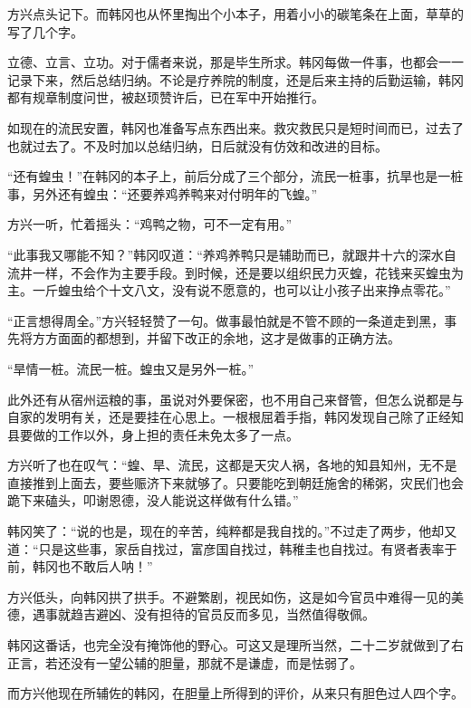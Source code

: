 方兴点头记下。而韩冈也从怀里掏出个小本子，用着小小的碳笔条在上面，草草的写了几个字。

立德、立言、立功。对于儒者来说，那是毕生所求。韩冈每做一件事，也都会一一记录下来，然后总结归纳。不论是疗养院的制度，还是后来主持的后勤运输，韩冈都有规章制度问世，被赵顼赞许后，已在军中开始推行。

如现在的流民安置，韩冈也准备写点东西出来。救灾救民只是短时间而已，过去了也就过去了。不及时加以总结归纳，日后就没有仿效和改进的目标。

“还有蝗虫！”在韩冈的本子上，前后分成了三个部分，流民一桩事，抗旱也是一桩事，另外还有蝗虫：“还要养鸡养鸭来对付明年的飞蝗。”

方兴一听，忙着摇头：“鸡鸭之物，可不一定有用。”

“此事我又哪能不知？”韩冈叹道：“养鸡养鸭只是辅助而已，就跟井十六的深水自流井一样，不会作为主要手段。到时候，还是要以组织民力灭蝗，花钱来买蝗虫为主。一斤蝗虫给个十文八文，没有说不愿意的，也可以让小孩子出来挣点零花。”

“正言想得周全。”方兴轻轻赞了一句。做事最怕就是不管不顾的一条道走到黑，事先将方方面面的都想到，并留下改正的余地，这才是做事的正确方法。

“旱情一桩。流民一桩。蝗虫又是另外一桩。”

此外还有从宿州运粮的事，虽说对外要保密，也不用自己来督管，但怎么说都是与自家的发明有关，还是要挂在心思上。一根根屈着手指，韩冈发现自己除了正经知县要做的工作以外，身上担的责任未免太多了一点。

方兴听了也在叹气：“蝗、旱、流民，这都是天灾人祸，各地的知县知州，无不是直接推到上面去，要些赈济下来就够了。只要能吃到朝廷施舍的稀粥，灾民们也会跪下来磕头，叩谢恩德，没人能说这样做有什么错。”

韩冈笑了：“说的也是，现在的辛苦，纯粹都是我自找的。”不过走了两步，他却又道：“只是这些事，家岳自找过，富彦国自找过，韩稚圭也自找过。有贤者表率于前，韩冈也不敢后人呐！”

方兴低头，向韩冈拱了拱手。不避繁剧，视民如伤，这是如今官员中难得一见的美德，遇事就趋吉避凶、没有担待的官员反而多见，当然值得敬佩。

韩冈这番话，也完全没有掩饰他的野心。可这又是理所当然，二十二岁就做到了右正言，若还没有一望公辅的胆量，那就不是谦虚，而是怯弱了。

而方兴他现在所辅佐的韩冈，在胆量上所得到的评价，从来只有胆色过人四个字。

